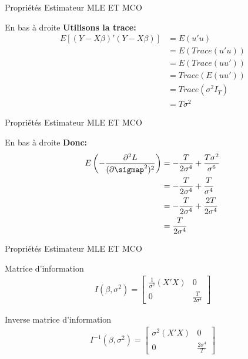 \documentclass{beamer}
\begin{document}
\begin{frame}{Propriétés Estimateur MLE ET MCO}
\begin{block}{En bas à droite}
\textbf{Utilisons la trace:}
\begin{align*}
E[(Y-X \beta)'(Y-X \beta)] & = E(u'u) \\ & = E(Trace(u'u)) \\ & =  E(Trace(uu')) \\ & = Trace(E(uu')) \\ & = Trace(\sigma^2 I_T) \\ & = T\sigma^2
\end{align*}
\end{block}
\end{frame}

\begin{frame}{Propriétés Estimateur MLE ET MCO}
\begin{block}{En bas à droite}
\textbf{Donc:}
\begin{align*}
E \left(-\frac{\partial^2 L}{(\partial \sigmap^2)^2} \right) & = -\frac{T}{2 \sigma^4}+\frac{T \sigma^2}{\sigma^6} \\ & = -\frac{T}{2 \sigma^4}+\frac{T}{\sigma^4} \\ & =  -\frac{T}{2 \sigma^4}+\frac{2T}{2\sigma^4} \\ & = \frac{T}{2\sigma^4}
\end{align*}
\end{block}
\end{frame}

\begin{frame}{Propriétés Estimateur MLE ET MCO}
\begin{block}{Matrice d'information}
\begin{align*}
I(\beta, \sigma^2)=\begin{bmatrix}
\frac{1}{\sigma^2} (X'X) & 0 \\
0 & \frac{T}{2\sigma^4}
\end{bmatrix}
\end{align*}
\end{block}

\begin{block}{Inverse matrice d'information}
\begin{align*}
I^{-1}(\beta, \sigma^2)=\begin{bmatrix}
 \sigma^2(X'X) & 0 \\
0 & \frac{2\sigma^4}{T}
\end{bmatrix}
\end{align*}
\end{block}

\end{frame}
\end{document}
